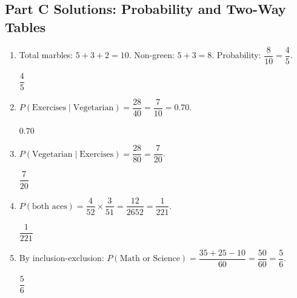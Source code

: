 \documentclass[14pt]{extarticle}
\begin{document}
\subsection*{Part C Solutions: Probability and Two-Way Tables}
\begin{enumerate}
  \item Total marbles: \(5 + 3 + 2 = 10\). Non-green: \(5 + 3 = 8\). Probability: \(\dfrac{8}{10} = \dfrac{4}{5}\).

  \(\boxed{\dfrac{4}{5}}\)

  \item \(P(\text{Exercises} \mid \text{Vegetarian}) = \dfrac{28}{40} = \dfrac{7}{10} = 0.70\).

  \(\boxed{0.70}\)

  \item \(P(\text{Vegetarian} \mid \text{Exercises}) = \dfrac{28}{80} = \dfrac{7}{20}\).

  \(\boxed{\dfrac{7}{20}}\)

  \item \(P(\text{both aces}) = \dfrac{4}{52} \times \dfrac{3}{51} = \dfrac{12}{2652} = \dfrac{1}{221}\).

  \(\boxed{\dfrac{1}{221}}\)

  \item By inclusion-exclusion: \(P(\text{Math or Science}) = \dfrac{35 + 25 - 10}{60} = \dfrac{50}{60} = \dfrac{5}{6}\).

  \(\boxed{\dfrac{5}{6}}\)
\end{enumerate}
\end{document}
